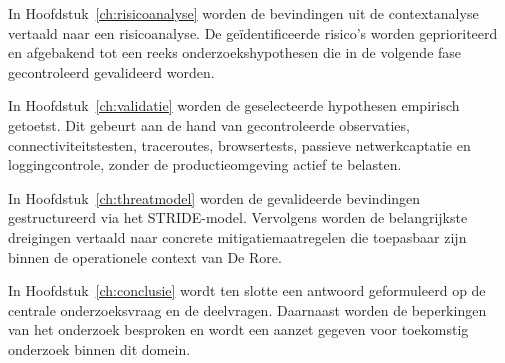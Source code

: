 In Hoofdstuk~\ref{ch:risicoanalyse} worden de bevindingen uit de contextanalyse vertaald naar een risicoanalyse. De geïdentificeerde risico's worden geprioriteerd en afgebakend tot een reeks onderzoekshypothesen die in de volgende fase gecontroleerd gevalideerd worden.

In Hoofdstuk~\ref{ch:validatie} worden de geselecteerde hypothesen empirisch getoetst. Dit gebeurt aan de hand van gecontroleerde observaties, connectiviteitstesten, traceroutes, browsertests, passieve netwerkcaptatie en loggingcontrole, zonder de productieomgeving actief te belasten.

In Hoofdstuk~\ref{ch:threatmodel} worden de gevalideerde bevindingen gestructureerd via het STRIDE-model. Vervolgens worden de belangrijkste dreigingen vertaald naar concrete mitigatiemaatregelen die toepasbaar zijn binnen de operationele context van De Rore.

In Hoofdstuk~\ref{ch:conclusie} wordt ten slotte een antwoord geformuleerd op de centrale onderzoeksvraag en de deelvragen. Daarnaast worden de beperkingen van het onderzoek besproken en wordt een aanzet gegeven voor toekomstig onderzoek binnen dit domein.